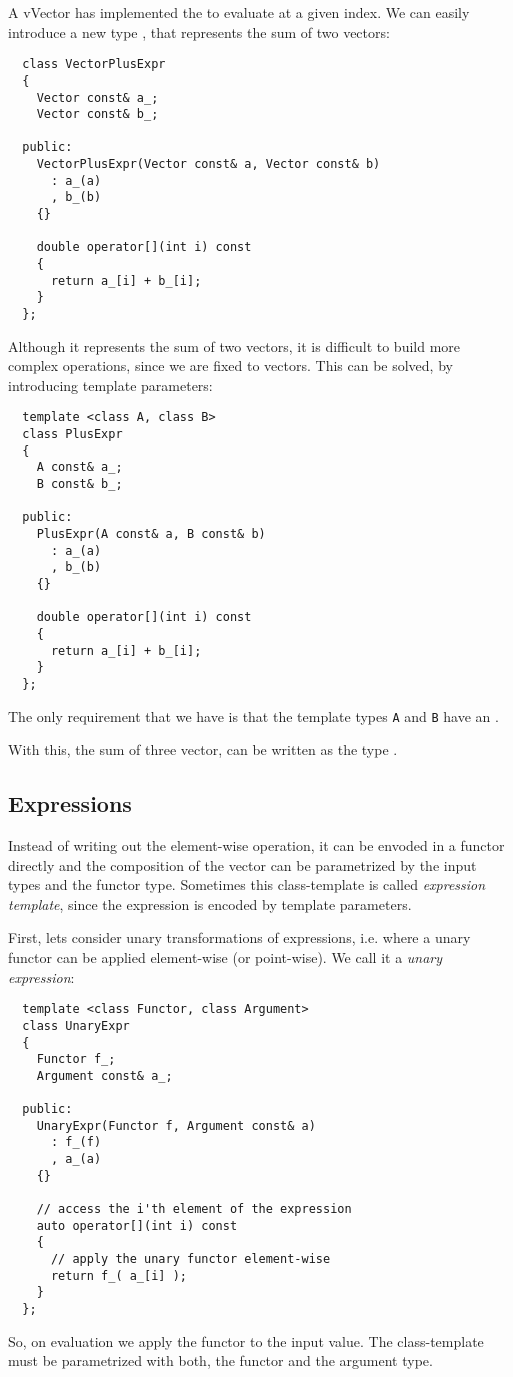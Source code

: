 \begin{example}
  A vVector has implemented the  to evaluate at a given index. We can easily introduce a new type , that represents the sum of
  two vectors:
  \begin{verbatim}
  class VectorPlusExpr
  {
    Vector const& a_;
    Vector const& b_;

  public:
    VectorPlusExpr(Vector const& a, Vector const& b)
      : a_(a)
      , b_(b)
    {}

    double operator[](int i) const
    {
      return a_[i] + b_[i];
    }
  };
  \end{verbatim}

  Although it represents the sum of two vectors, it is difficult to build more complex operations, since we are fixed to vectors. This can be
  solved, by introducing template parameters:
  \begin{verbatim}
  template <class A, class B>
  class PlusExpr
  {
    A const& a_;
    B const& b_;

  public:
    PlusExpr(A const& a, B const& b)
      : a_(a)
      , b_(b)
    {}

    double operator[](int i) const
    {
      return a_[i] + b_[i];
    }
  };
  \end{verbatim}
  The only requirement that we have is that the template types \texttt{A} and \texttt{B} have an .

  With this, the sum of three vector, can be written as the type .
\end{example}


\subsection{Expressions}
Instead of writing out the element-wise operation, it can be envoded in a functor directly and the composition of the vector can be
parametrized by the input types and the functor type. Sometimes this class-template is called \emph{expression template}, since the
expression is encoded by template parameters.

First, lets consider unary transformations of expressions, i.e. where a unary functor can be applied element-wise (or point-wise).
We call it a \emph{unary expression}:
%
\begin{verbatim}
  template <class Functor, class Argument>
  class UnaryExpr
  {
    Functor f_;
    Argument const& a_;

  public:
    UnaryExpr(Functor f, Argument const& a)
      : f_(f)
      , a_(a)
    {}

    // access the i'th element of the expression
    auto operator[](int i) const
    {
      // apply the unary functor element-wise
      return f_( a_[i] );
    }
  };
\end{verbatim}
%
So, on evaluation we apply the functor to the input value. The class-template must be parametrized with both, the functor and the argument type.


